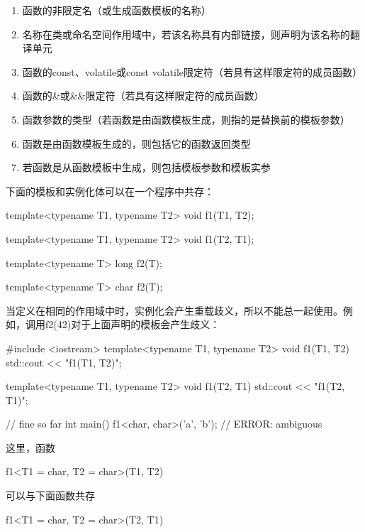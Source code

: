 \begin{enumerate}
\item 
函数的非限定名（或生成函数模板的名称）

\item 
名称在类或命名空间作用域中，若该名称具有内部链接，则声明为该名称的翻译单元

\item 
函数的const、volatile或const volatile限定符（若具有这样限定符的成员函数）

\item 
函数的\&或\&\&限定符（若具有这样限定符的成员函数）

\item 
函数参数的类型（若函数是由函数模板生成，则指的是替换前的模板参数）

\item 
函数是由函数模板生成的，则包括它的函数返回类型

\item 
若函数是从函数模板中生成，则包括模板参数和模板实参
\end{enumerate}

下面的模板和实例化体可以在一个程序中共存：

\begin{cpp}
template<typename T1, typename T2>
void f1(T1, T2);

template<typename T1, typename T2>
void f1(T2, T1);

template<typename T>
long f2(T);

template<typename T>
char f2(T);
\end{cpp}

当定义在相同的作用域中时，实例化会产生重载歧义，所以不能总一起使用。例如，调用f2(42)对于上面声明的模板会产生歧义：

\begin{cpp}
#include <iostream>
template<typename T1, typename T2>
void f1(T1, T2)
{
	std::cout << "f1(T1, T2)\n";
}

template<typename T1, typename T2>
void f1(T2, T1)
{
	std::cout << "f1(T2, T1)\n";
}

// fine so far
int main()
{
	f1<char, char>('a', 'b'); // ERROR: ambiguous
}
\end{cpp}

这里，函数

\begin{cpp}
f1<T1 = char, T2 = char>(T1, T2)
\end{cpp}

可以与下面函数共存

\begin{cpp}
f1<T1 = char, T2 = char>(T2, T1)
\end{cpp}

